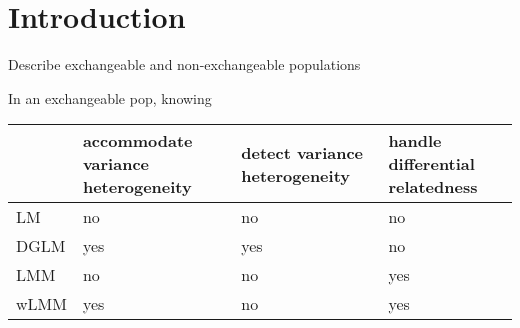 \chapter{Introduction}


Describe exchangeable and non-exchangeable populations

In an exchangeable pop, knowing 

\begin{table}[ht]
	\begin{tabular}{lp{1in}p{1in}p{1in}}
		\toprule
				& accommodate variance heterogeneity & detect variance heterogeneity & handle differential relatedness\\
		\midrule
		LM 		& no	& no	& no\\
		DGLM 	& yes 	& yes 	& no\\
		LMM  	& no 	& no	& yes\\
		wLMM	& yes	& no	& yes\\
		\bottomrule
	\end{tabular}
\end{table}
